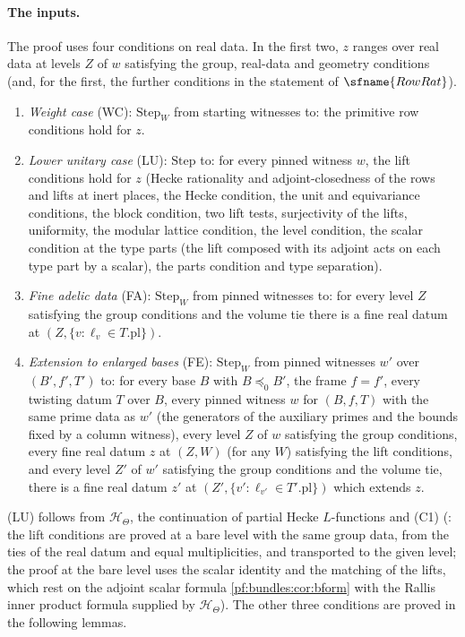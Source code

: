 \paragraph{The inputs.}
The proof uses four conditions on real data. In the first two, $z$ ranges over real data at levels $Z$ of $w$ satisfying the group, real-data
and geometry conditions (and, for the first, the further conditions in the statement of $\sfname{RowRat}$).
\begin{enumerate}[label=(\textsc{\roman*})]
\item \emph{Weight case} (WC): $\mathrm{Step}_W$ from starting witnesses to: the primitive row conditions hold for $z$.
\item \emph{Lower unitary case} (LU): $\mathrm{Step}$ to: for every pinned witness $w$, the lift conditions hold for $z$ (Hecke rationality and
adjoint-closedness of the rows and lifts at inert places, the Hecke condition, the unit and equivariance conditions, the block condition, two lift
tests, surjectivity of the lifts, uniformity, the modular lattice condition, the level condition, the scalar condition at the type parts (the lift
composed with its adjoint acts on each type part by a scalar), the parts condition and type separation).
\item \emph{Fine adelic data} (FA): $\mathrm{Step}_W$ from pinned witnesses to: for every level $Z$ satisfying the group conditions and
the volume tie there is a fine real datum at $(Z,\{v:\ell_v\in T.\mathrm{pl}\})$.
\item \emph{Extension to enlarged bases} (FE): $\mathrm{Step}_W$ from pinned witnesses $w'$ over $(B',f',T')$ to: for every base $B$ with
$B\preceq_0B'$, the frame $f=f'$, every twisting datum $T$ over $B$, every pinned witness $w$ for $(B,f,T)$ with the same prime data as $w'$
(the generators of the auxiliary primes and the bounds fixed by a column witness), every level $Z$ of $w$ satisfying the group conditions,
every fine real datum $z$ at $(Z,W)$ (for any $W$) satisfying the lift conditions, and every level $Z'$ of $w'$ satisfying the group conditions
and the volume tie, there is a fine real datum $z'$ at $(Z',\{v':\ell_{v'}\in T'.\mathrm{pl}\})$ which extends $z$.
\end{enumerate}
(LU) follows from $\mathcal H_\Theta$, the continuation of partial Hecke $L$-functions and (C1)
(: the lift conditions are proved at a bare level with the same group data, from the ties of
the real datum and equal multiplicities, and transported to the given level; the proof at the bare level uses the scalar identity and the matching
of the lifts, which rest on the adjoint scalar formula \cref{pf:bundles:cor:bform} with the Rallis inner product formula supplied by $\mathcal
H_\Theta$). The other three conditions are proved in the following lemmas.

